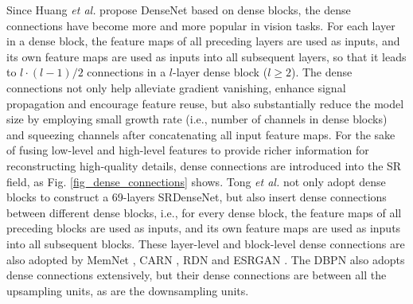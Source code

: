 {\label{sec_dense_connections}
Since Huang \textit{et al.}  propose DenseNet based on dense blocks, the dense connections have become more and more popular in vision tasks.
For each layer in a dense block, the feature maps of all preceding layers are used as inputs, and its own feature maps are used as inputs into all subsequent layers, so that it leads to $l \cdot (l - 1) / 2$ connections in a $l$-layer dense block ($l \ge 2$).
The dense connections not only help alleviate gradient vanishing, enhance signal propagation and encourage feature reuse, but also substantially reduce the model size by employing small growth rate (i.e., number of channels in dense blocks) and squeezing channels after concatenating all input feature maps.
For the sake of fusing low-level and high-level features to provide richer information for reconstructing high-quality details, dense connections are introduced into the SR field, as Fig. \ref{fig_dense_connections} shows.
Tong \textit{et al.}  not only adopt dense blocks to construct a 69-layers SRDenseNet, but also insert dense connections between different dense blocks, i.e., for every dense block, the feature maps of all preceding blocks are used as inputs, and its own feature maps are used as inputs into all subsequent blocks.
These layer-level and block-level dense connections are also adopted by MemNet , CARN , RDN  and ESRGAN .
The DBPN  also adopts dense connections extensively, but their dense connections are between all the upsampling units, as are the downsampling units.

}

